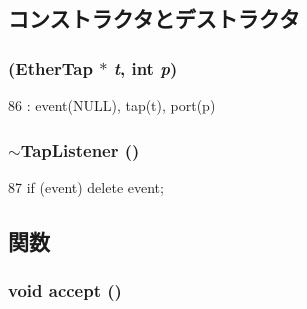 \subsection{コンストラクタとデストラクタ}
\hypertarget{classTapListener_abbe73917dbac66cd5cbb5546595150ff}{
\subsubsection[{TapListener}]{ ({\bf EtherTap} $\ast$ {\em t}, \/  int {\em p})}}
\label{classTapListener_abbe73917dbac66cd5cbb5546595150ff}



\begin{DoxyCode}
86         : event(NULL), tap(t), port(p) {}
\end{DoxyCode}
\hypertarget{classTapListener_a7cbe6ce128d9f0afb6d6d0e3da85e283}{
\subsubsection[{$\sim$TapListener}]{\setlength{\rightskip}{0pt plus 5cm}$\sim${\bf TapListener} ()}}
\label{classTapListener_a7cbe6ce128d9f0afb6d6d0e3da85e283}



\begin{DoxyCode}
87 { if (event) delete event; }
\end{DoxyCode}


\subsection{関数}
\hypertarget{classTapListener_aadb9f3b844fb4cf98288cd3c60a3af91}{
\subsubsection[{accept}]{\setlength{\rightskip}{0pt plus 5cm}void accept ()}}
\label{classTapListener_aadb9f3b844fb4cf98288cd3c60a3af91}



